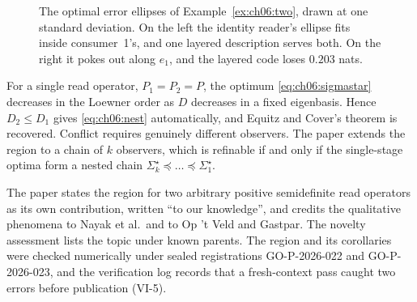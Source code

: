 \begin{figure}[tbp]\centering
{}\hspace{1.2cm}
\caption{The optimal error ellipses of Example~\ref{ex:ch06:two}, drawn at one standard deviation. On the left the identity reader's ellipse fits inside consumer~1's, and one layered description serves both. On the right it pokes out along $e_1$, and the layered code loses $0.203$ nats.}
\label{fig:ch06:two}
\end{figure}

For a single read operator, $P_1=P_2=P$, the optimum \cref{eq:ch06:sigmastar} decreases in the Loewner order as $D$ decreases in a fixed eigenbasis. Hence $D_2\le D_1$ gives \cref{eq:ch06:nest} automatically, and Equitz and Cover's theorem is recovered. Conflict requires genuinely different observers. The paper extends the region to a chain of $k$ observers, which is refinable if and only if the single-stage optima form a nested chain $\Sigma_k^\star\preceq\dots\preceq\Sigma_1^\star$.

The paper states the region for two arbitrary positive semidefinite read operators as its own contribution, written ``to our knowledge'', and credits the qualitative phenomena to Nayak et al.\ and to Op 't Veld and Gastpar. The novelty assessment lists the topic under known parents. The region and its corollaries were checked numerically under sealed registrations GO-P-2026-022 and GO-P-2026-023, and the verification log records that a fresh-context pass caught two errors before publication (VI-5).


